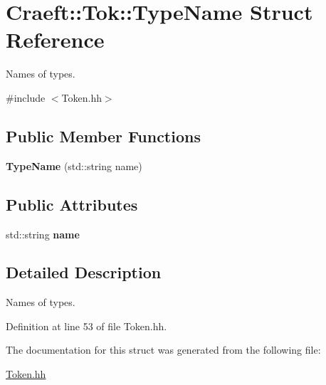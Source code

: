 \hypertarget{struct_craeft_1_1_tok_1_1_type_name}{}\section{Craeft\+:\+:Tok\+:\+:Type\+Name Struct Reference}
\label{struct_craeft_1_1_tok_1_1_type_name}


Names of types.  




{\ttfamily \#include $<$Token.\+hh$>$}

\subsection*{Public Member Functions}
\begin{DoxyCompactItemize}
\item 
\hypertarget{struct_craeft_1_1_tok_1_1_type_name_adf5fcea8e780d71f3a79de97da40e4a9}{}\label{struct_craeft_1_1_tok_1_1_type_name_adf5fcea8e780d71f3a79de97da40e4a9} 
{\bfseries Type\+Name} (std\+::string name)
\end{DoxyCompactItemize}
\subsection*{Public Attributes}
\begin{DoxyCompactItemize}
\item 
\hypertarget{struct_craeft_1_1_tok_1_1_type_name_a868758b94e212af6ae44bcd819c23ef7}{}\label{struct_craeft_1_1_tok_1_1_type_name_a868758b94e212af6ae44bcd819c23ef7} 
std\+::string {\bfseries name}
\end{DoxyCompactItemize}


\subsection{Detailed Description}
Names of types. 

Definition at line 53 of file Token.\+hh.



The documentation for this struct was generated from the following file\+:\begin{DoxyCompactItemize}
\item 
\hyperlink{_token_8hh}{Token.\+hh}\end{DoxyCompactItemize}
